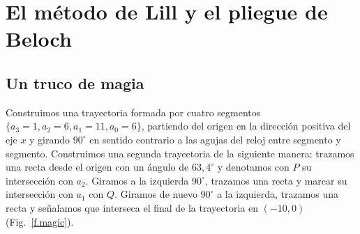 
\chapter{El método de Lill y el pliegue de Beloch}\label{c.origami-cube}


\section{Un truco de magia}\label{s.magic}

Construimos una trayectoria formada por cuatro segmentos $\{a_3=1,a_2=6,a_1=11,a_0=6\}$, partiendo del origen en la dirección positiva del eje $x$ y girando $90^\circ$ en sentido contrario a las agujas del reloj entre segmento y segmento. Construimos una segunda trayectoria de la siguiente manera: trazamos una recta desde el origen con un ángulo de $63,4^\circ$ y denotamos con $P$ su intersección con $a_2$. Giramos a la izquierda $90^\circ$, trazamos una recta y marcar su intersección con $a_1$ con $Q$. Giramos de nuevo $90^\circ$ a la izquierda, trazamos una recta y señalamos que interseca el final de la trayectoria en $(-10,0)$ (Fig.~\ref{f.magic}).

